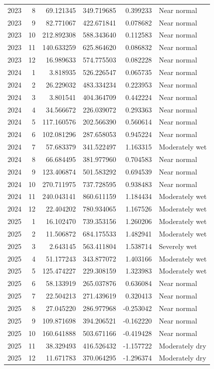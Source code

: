 \begin{tabular}{rrrrrl}
2023 & 8 & 69.121345 & 349.719685 & 0.399233 & Near normal \\
2023 & 9 & 82.771067 & 422.671841 & 0.078682 & Near normal \\
2023 & 10 & 212.892308 & 588.343640 & 0.112583 & Near normal \\
2023 & 11 & 140.633259 & 625.864620 & 0.086832 & Near normal \\
2023 & 12 & 16.989633 & 574.775503 & 0.082228 & Near normal \\
2024 & 1 & 3.818935 & 526.226547 & 0.065735 & Near normal \\
2024 & 2 & 26.229032 & 483.334234 & 0.223953 & Near normal \\
2024 & 3 & 3.801541 & 404.364709 & 0.442224 & Near normal \\
2024 & 4 & 34.566672 & 226.039072 & 0.293363 & Near normal \\
2024 & 5 & 117.160576 & 202.566390 & 0.560614 & Near normal \\
2024 & 6 & 102.081296 & 287.658053 & 0.945224 & Near normal \\
2024 & 7 & 57.683379 & 341.522497 & 1.163315 & Moderately wet \\
2024 & 8 & 66.684495 & 381.977960 & 0.704583 & Near normal \\
2024 & 9 & 123.406874 & 501.583292 & 0.694539 & Near normal \\
2024 & 10 & 270.711975 & 737.728595 & 0.938483 & Near normal \\
2024 & 11 & 240.043141 & 860.611159 & 1.184434 & Moderately wet \\
2024 & 12 & 22.404202 & 780.934065 & 1.167526 & Moderately wet \\
2025 & 1 & 16.102470 & 739.353156 & 1.260206 & Moderately wet \\
2025 & 2 & 11.506872 & 684.175533 & 1.482941 & Moderately wet \\
2025 & 3 & 2.643145 & 563.411804 & 1.538714 & Severely wet \\
2025 & 4 & 51.177243 & 343.877072 & 1.403166 & Moderately wet \\
2025 & 5 & 125.474227 & 229.308159 & 1.323983 & Moderately wet \\
2025 & 6 & 58.133919 & 265.037876 & 0.636084 & Near normal \\
2025 & 7 & 22.504213 & 271.439619 & 0.320413 & Near normal \\
2025 & 8 & 27.045220 & 286.977968 & -0.253042 & Near normal \\
2025 & 9 & 109.871698 & 394.206521 & -0.162220 & Near normal \\
2025 & 10 & 160.641888 & 503.671166 & -0.419428 & Near normal \\
2025 & 11 & 38.329493 & 416.526432 & -1.157722 & Moderately dry \\
2025 & 12 & 11.671783 & 370.064295 & -1.296374 & Moderately dry \\
\bottomrule
\end{tabular}
